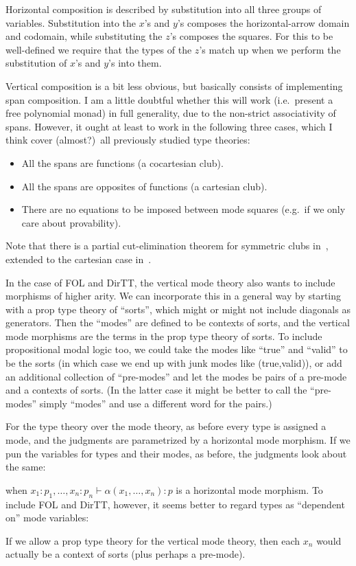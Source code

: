 \documentclass{article}
\theoremstyle{definition}
\def\type{\;\mathsf{type}}
\begin{document}
Horizontal composition is described by substitution into all three groups of variables.
Substitution into the $x$'s and $y$'s composes the horizontal-arrow domain and codomain, while substituting the $z$'s composes the squares.
For this to be well-defined we require that the types of the $z$'s match up when we perform the substitution of $x$'s and $y$'s into them.

Vertical composition is a bit less obvious, but basically consists of implementing span composition.
I am a little doubtful whether this will work (i.e.\ present a free polynomial monad) in full generality, due to the non-strict associativity of spans.
However, it ought at least to work in the following three cases, which I think cover (almost?)\ all previously studied type theories:
\begin{itemize}
\item All the spans are functions (a cocartesian club).
\item All the spans are opposites of functions (a cartesian club).
\item There are no equations to be imposed between mode squares (e.g.\ if we only care about provability).
\end{itemize}
Note that there is a partial cut-elimination theorem for symmetric clubs in~\cite{kelly:mv-funct-calc}, extended to the cartesian case in~\cite{kelly:club-doc}.

In the case of FOL and DirTT, the vertical mode theory also wants to include morphisms of higher arity.
We can incorporate this in a general way by starting with a prop type theory of ``sorts'', which might or might not include diagonals as generators.
Then the ``modes'' are defined to be contexts of sorts, and the vertical mode morphisms are the terms in the prop type theory of sorts.
To include propositional modal logic too, we could take the modes like ``true'' and ``valid'' to be the sorts (in which case we end up with junk modes like (true,valid)), or add an additional collection of ``pre-modes'' and let the modes be pairs of a pre-mode and a contexts of sorts.
(In the latter case it might be better to call the ``pre-modes'' simply ``modes'' and use a different word for the pairs.)

For the type theory over the mode theory, as before every type is assigned a mode, and the judgments are parametrized by a horizontal mode morphism.
If we pun the variables for types and their modes, as before, the judgments look about the same:
when $x_1:p_1, \dots, x_n:p_n \vdash \alpha(x_1,\dots,x_n) : p$ is a horizontal mode morphism.
To include FOL and DirTT, however, it seems better to regard types as ``dependent on'' mode variables:
If we allow a prop type theory for the vertical mode theory, then each $x_n$ would actually be a context of sorts (plus perhaps a pre-mode).
\end{document}
